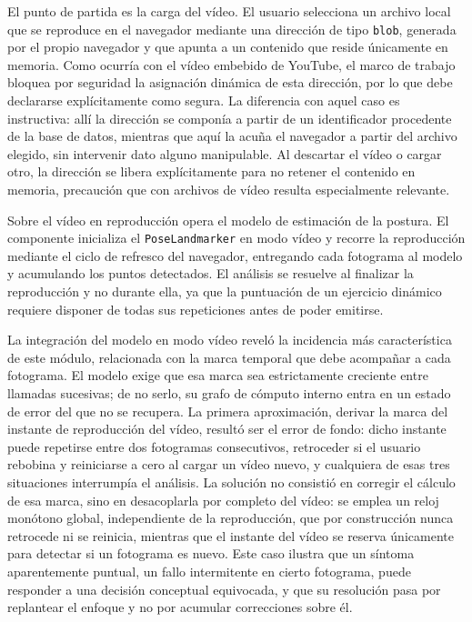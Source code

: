 \documentclass[12pt,a4paper,twoside,openright]{book}
\begin{document}
    El punto de partida es la carga del vídeo. El usuario selecciona un archivo
    local que se reproduce en el navegador mediante una dirección de tipo
    \texttt{blob}, generada por el propio navegador y que apunta a un contenido
    que reside únicamente en memoria. Como ocurría con el vídeo embebido de
    YouTube, el marco de trabajo bloquea por seguridad la asignación dinámica de
    esta dirección, por lo que debe declararse explícitamente como segura. La
    diferencia con aquel caso es instructiva: allí la dirección se componía a
    partir de un identificador procedente de la base de datos, mientras que aquí
    la acuña el navegador a partir del archivo elegido, sin intervenir dato alguno
    manipulable. Al descartar el vídeo o cargar otro, la dirección se libera
    explícitamente para no retener el contenido en memoria, precaución que con
    archivos de vídeo resulta especialmente relevante.

    Sobre el vídeo en reproducción opera el modelo de estimación de la postura. El
    componente inicializa el \texttt{PoseLandmarker} en modo vídeo y recorre la
    reproducción mediante el ciclo de refresco del navegador, entregando cada
    fotograma al modelo y acumulando los puntos detectados. El análisis se
    resuelve al finalizar la reproducción y no durante ella, ya que la puntuación
    de un ejercicio dinámico requiere disponer de todas sus repeticiones antes de
    poder emitirse.

    La integración del modelo en modo vídeo reveló la incidencia más
    característica de este módulo, relacionada con la marca temporal que debe
    acompañar a cada fotograma. El modelo exige que esa marca sea estrictamente
    creciente entre llamadas sucesivas; de no serlo, su grafo de cómputo interno
    entra en un estado de error del que no se recupera. La primera aproximación,
    derivar la marca del instante de reproducción del vídeo, resultó ser el error
    de fondo: dicho instante puede repetirse entre dos fotogramas consecutivos,
    retroceder si el usuario rebobina y reiniciarse a cero al cargar un vídeo
    nuevo, y cualquiera de esas tres situaciones interrumpía el análisis. La
    solución no consistió en corregir el cálculo de esa marca, sino en
    desacoplarla por completo del vídeo: se emplea un reloj monótono global,
    independiente de la reproducción, que por construcción nunca retrocede ni se
    reinicia, mientras que el instante del vídeo se reserva únicamente para
    detectar si un fotograma es nuevo. Este caso ilustra que un síntoma
    aparentemente puntual, un fallo intermitente en cierto fotograma, puede
    responder a una decisión conceptual equivocada, y que su resolución pasa por
    replantear el enfoque y no por acumular correcciones sobre él.
\end{document}

